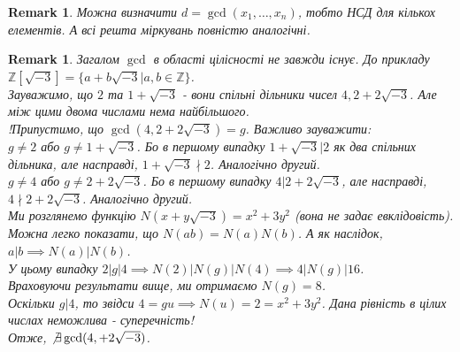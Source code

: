 \documentclass[a4paper, 10pt]{article}
\theoremstyle{theoremdd}
\theoremstyle{theoremdd}
\theoremstyle{theoremdd}
\theoremstyle{theoremdd}
\theoremstyle{theoremdd}
\theoremstyle{theoremdd}
\newtheorem{remark}[theorem]{Remark}
\theoremstyle{theoremdd}
\theoremstyle{theoremdd}
\begin{document}
\begin{remark}
Можна визначити $d = \gcd(x_1,\dots,x_n)$, тобто НСД для кількох елементів. А всі решта міркувань повністю аналогічні.
\end{remark}

\begin{remark}
Загалом $\gcd$ в області цілісності не завжди існує. До прикладу $\mathbb{Z}[\sqrt{-3}] = \{a + b \sqrt{-3} | a,b \in \mathbb{Z}\}$.\\
Зауважимо, що $2$ та $1+\sqrt{-3}$ - вони спільні дільники чисел $4,2+2 \sqrt{-3}$. Але між цими двома числами нема найбільшого.\\
!Припустимо, що $\gcd(4,2+2\sqrt{-3}) = g$. Важливо зауважити:\\
$g \neq 2$ або $g \neq 1+\sqrt{-3}$. Бо в першому випадку $1+\sqrt{-3} | 2$ як два спільних дільника, але насправді, $1+\sqrt{-3} \nmid 2$. Аналогічно другий.\\
$g \neq 4$ або $g \neq 2+2\sqrt{-3}$. Бо в першому випадку $4 | 2+2\sqrt{-3}$, але насправді, $4 \nmid 2+2\sqrt{-3}$. Аналогічно другий.\\
Ми розглянемо функцію $N(x+y\sqrt{-3}) = x^2+3y^2$ (вона не задає евклідовість). Можна легко показати, що $N(ab) = N(a)N(b)$. А як наслідок, $a | b \implies N(a) | N(b)$.\\
У цьому випадку $2 | g | 4 \implies N(2) | N(g) | N(4) \implies 4 | N(g) | 16$.\\
Враховуючи результати вище, ми отримаємо $N(g) = 8$.\\
Оскільки $g | 4$, то звідси $4 = gu \implies N(u) = 2 = x^2+3y^2$. Дана рівність в цілих числах неможлива - суперечність!\\
Отже, $\not\exists \gcd(4,  +2\sqrt{-3})$.

\end{remark}
\end{document}
